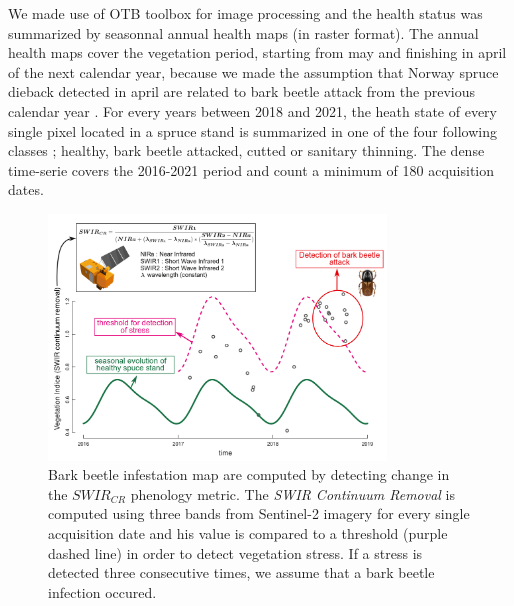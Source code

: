 \documentclass[3p,procedia]{elsarticle}
\begin{document}
We made use of OTB toolbox \citep{grizonnet_2017_OTB} for image processing and the health status was summarized by seasonnal annual health maps (in raster format).
The annual health maps cover the vegetation period, starting from may and finishing in april of the next calendar year, because we made the assumption that Norway spruce dieback detected in april are related to bark beetle attack from the previous calendar year \citep{muller_features_2022}.
For every years between 2018 and 2021, the heath state of every single pixel located in a spruce stand is summarized in one of the four following classes ; healthy, bark beetle attacked, cutted or sanitary thinning.
The dense time-serie covers the 2016-2021 period and count a minimum of 180 acquisition dates. 


\begin{figure}
	\centering
	\includegraphics[width=0.8\textwidth]{fctHarmo.png}
	\caption{Bark beetle infestation map are computed by detecting change in the $SWIR_{CR}$ phenology metric. The \textit{SWIR Continuum Removal} is computed using three bands from Sentinel-2 imagery for every single acquisition date and his value is compared to a threshold (purple dashed line) in order to detect vegetation stress. If a stress is detected three consecutive times, we assume that a bark beetle infection occured.}
	\label{fig:harmo}
\end{figure}
\end{document}
